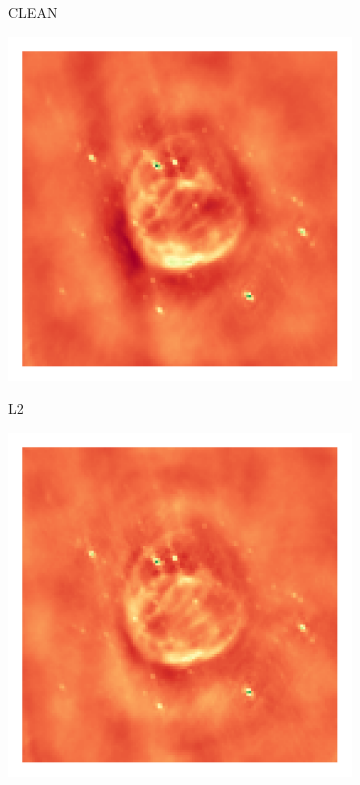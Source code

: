 \begin{figure}[h]
	\centering
	\begin{subfigure}[b]{0.3\linewidth}
		\begin{center}CLEAN\end{center}
		\includegraphics[width=\linewidth, trim={18px 19px 18px 18px}, clip]{./chapters/05.results/g55/clean_image.png}
	\end{subfigure}
	\begin{subfigure}[b]{0.3\linewidth}
		\begin{center}L2\end{center}
		\includegraphics[width=\linewidth, trim={18px 19px 18px 18px}, clip]{./chapters/05.results/g55/L2_image.png}

\end{subfigure}
\end{figure}
